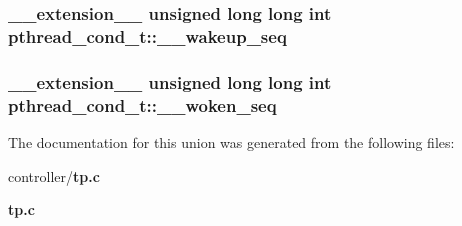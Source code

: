 \subsubsection[{\_\-\_\-wakeup\_\-seq}]{\setlength{\rightskip}{0pt plus 5cm}\_\-\_\-extension\_\-\_\- unsigned long long int {\bf pthread\_\-cond\_\-t::\_\-\_\-wakeup\_\-seq}}\label{unionpthread__cond__t_a5785e983065fe0034198e99a067a3f80}
\subsubsection[{\_\-\_\-woken\_\-seq}]{\setlength{\rightskip}{0pt plus 5cm}\_\-\_\-extension\_\-\_\- unsigned long long int {\bf pthread\_\-cond\_\-t::\_\-\_\-woken\_\-seq}}\label{unionpthread__cond__t_a6e58a7da8bd7a2e847e8a281c776471c}


The documentation for this union was generated from the following files:\begin{DoxyCompactItemize}
\item 
controller/{\bf tp.c}\item 
{\bf tp.c}\end{DoxyCompactItemize}
